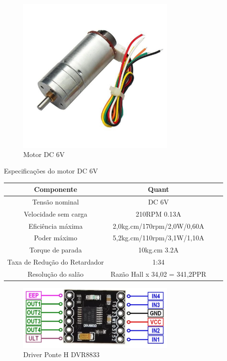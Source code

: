 \begin{figure}[h]
	\centering
	\includegraphics[width=0.7\textwidth]{figures/CHR_GM25_370}
	\caption{Motor DC 6V \cite{motor_dc_6v_encoder}}
\end{figure}


\begin{quadro}[htb]
	\caption{\label{Especificacoes_motordc_6v}Especificações do motor DC 6V}
	 \begin{tabular}{|c|c|c|c|}
		\hline
		\textbf{Componente} & \textbf{Quant} \\ \hline
		Tensão nominal & DC 6V  \\ \hline
		Velocidade sem carga  & 210RPM 0.13A  \\ \hline
		Eficiência máxima & 2,0kg.cm/170rpm/2,0W/0,60A   \\ \hline
		Poder máximo & 5,2kg.cm/110rpm/3,1W/1,10A   \\ \hline
		Torque de parada  & 10kg.cm 3.2A    \\ \hline
		Taxa de Redução do Retardador & 1:34  \\ \hline
		Resolução do salão & Razão Hall x 34,02 = 341,2PPR  \\ \hline
	\end{tabular}
	\end{quadro}

\begin{figure}[h]
	\centering
	\includegraphics[width=0.7\textwidth]{figures/DRV8833-Dual-Driver-Pinout}
	\caption{Driver Ponte H DVR8833 \cite{DRV8833_image}}
\end{figure}

